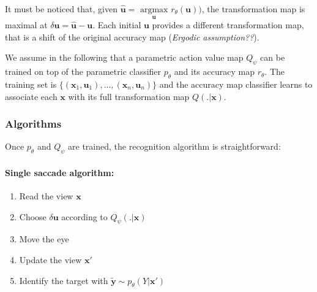 It must be noticed that, given $\hat{\boldsymbol{u}} = \underset{\boldsymbol{u}}{\text{ argmax }} 
r_\theta(\boldsymbol{u}))$,  the transformation map is maximal at $\delta\boldsymbol{u} = \hat{\boldsymbol{u}} - \boldsymbol{u}$. Each initial $\boldsymbol{u}$ provides a different transformation map, that is a shift of the original accuracy map (\emph{Ergodic assumption??}).
 
We assume in the following that a parametric action value map $Q_\psi$ can be trained on top of the parametric classifier $p_\theta$ and its accuracy map $r_\theta$.
The training set is $\{(\boldsymbol{x}_1, \boldsymbol{u}_1), ..., (\boldsymbol{x}_n, \boldsymbol{u}_n)\}$ and the accuracy map classifier learns to associate each $\boldsymbol{x}$ with its full transformation map $Q(.|\boldsymbol{x})$. 



\subsubsection{Algorithms}

Once $p_\theta$ and $Q_\psi$ are trained, the recognition algorithm is straightforward:  

\paragraph{Single saccade algorithm:}
\begin{enumerate}
	\item Read the view $\boldsymbol{x}$
	\item Choose $\delta\boldsymbol{u}$ according to $Q_\psi(.|\boldsymbol{x})$
	\item Move the eye 
	\item Update the view $\boldsymbol{x}'$
	\item Identify the target with $\tilde{\boldsymbol{y}} \sim p_\theta(Y|\boldsymbol{x}')$
\end{enumerate}


